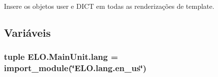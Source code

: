 Insere os objetos user e D\-I\-C\-T em todas as renderizações de template. 



\subsection{Variáveis}
\hypertarget{namespaceELO_1_1MainUnit_a7261ae58058821c58db5b6c3e02d830d}{
\subsubsection[{lang}]{\setlength{\rightskip}{0pt plus 5cm}tuple E\-L\-O.\-Main\-Unit.\-lang = import\-\_\-module(\char`\"{}E\-L\-O.\-lang.\-en\-\_\-us\char`\"{})}}\label{namespaceELO_1_1MainUnit_a7261ae58058821c58db5b6c3e02d830d}
